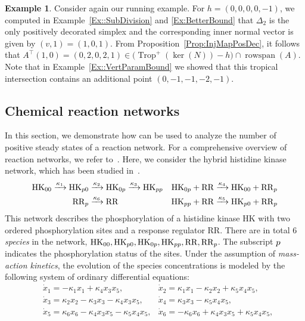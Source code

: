 \documentclass{article}
\theoremstyle{definition}
\newtheorem{example}[theorem]{Example}
\DeclareMathOperator{\Trop}{Trop}
\DeclareMathOperator{\rowspan}{rowspan}
\begin{document}
\begin{example}
\label{Eq:StircExample}
Consider again our running example. For $h=(0,0,0,0,-1)$, we computed in Example~\ref{Ex::SubDivision} and \ref{Ex:BetterBound} that $\Delta_2$ is the only positively decorated simplex and the corresponding inner normal vector is given by $(v,1)=(1,0,1)$. From Proposition~\ref{Prop:InjMapPosDec}, it follows that  $A^\top(1,0) = (0,2,0,2,1) \in \big(\Trop^+(\ker(N)) - h \big) \cap \rowspan(A)$. Note that in Example~\ref{Ex::VertParamBound} we showed that this tropical intersection contains an additional point  $(0,-1,-1,-2,-1)$.
\end{example}



\subsection{Chemical reaction networks}
\label{Sec:CRNT}
In this section, we demonstrate how  can be used to analyze the number of positive steady states of a reaction network. For a comprehensive overview of reaction networks, we refer to~\cite{DickensteinInvitation,FeliuRoleofAlg}. Here, we consider the hybrid histidine kinase network, which has been studied in~\cite{HHK,PLOS_IdParaRegions}.
\begin{align*}
\mathrm{HK}_{00} \xrightarrow{\kappa_{1}} \mathrm{HK}_{{\rm p} 0} &\xrightarrow{\kappa_{2}} \mathrm{HK}_{0{\rm p} } \xrightarrow {\kappa_{3}} \mathrm{HK}_{{\rm p} {\rm p} } &
\mathrm{HK}_{0{\rm p} } + \mathrm{RR} &\xrightarrow{\kappa_{4}} \mathrm{HK}_{00} + \mathrm{RR}_{{\rm p} } \\
\mathrm{RR}_{{\rm p} } &\xrightarrow{\kappa_{6}} \mathrm{RR}
 & \mathrm{HK}_{{\rm p} {\rm p} } + \mathrm{RR} &\xrightarrow{\kappa_{5}} \mathrm{HK}_{{\rm p} 0} + \mathrm{RR}_{{\rm p} }\end{align*}
This network describes the phosphorylation of a histidine kinase $\mathrm{HK}$ with two ordered phosphorylation sites and a  response regulator $\mathrm{RR}$. There are in total 6  \emph{species} in the network, $\mathrm{HK}_{00}, \mathrm{HK}_{{\rm p}0},\mathrm{HK}_{0{\rm p}},\mathrm{HK}_{{\rm pp}}, \mathrm{RR}, \mathrm{RR}_{{\rm p }}$. The subscript ${\rm p}$ indicates the phosphorylation status of the sites. Under the assumption of \emph{mass-action kinetics}, the evolution of the species concentrations is modeled by the following system of ordinary differential equations:
        \begin{equation}
        \label{ODE}
                    \begin{aligned}
      &\dot{x}_1 = -\kappa_1 x_1 + \kappa_4 x_3x_5, &\dot{x}_2 = \kappa_1 x_1 - \kappa_2 x_2 + \kappa_5 x_4x_5,   \\ 
  &\dot{x}_3 = \kappa_2 x_2 - \kappa_3 x_3 -\kappa_4 x_3x_5,  &\dot{x}_4 = \kappa_3 x_3 - \kappa_5 x_4x_5,    \\
 &\dot{x}_5 = \kappa_6 x_6 - \kappa_4x_3x_5  - \kappa_5 x_4x_5,   &\dot{x}_6 = -\kappa_6 x_6 + \kappa_4 x_3x_5 +\kappa_5 x_4x_5,  
    \end{aligned}
        \end{equation}
\end{document}
